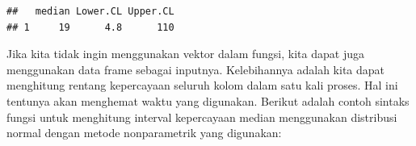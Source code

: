 \documentclass[]{book}
\newenvironment{Shaded}{\begin{snugshade}}{\end{snugshade}}
\newcommand{\KeywordTok}[1]{\textcolor[rgb]{0.13,0.29,0.53}{\textbf{#1}}}
\newcommand{\DataTypeTok}[1]{\textcolor[rgb]{0.13,0.29,0.53}{#1}}
\newcommand{\FloatTok}[1]{\textcolor[rgb]{0.00,0.00,0.81}{#1}}
\newcommand{\OperatorTok}[1]{\textcolor[rgb]{0.81,0.36,0.00}{\textbf{#1}}}
\newcommand{\NormalTok}[1]{#1}
\begin{document}
\begin{Shaded}
\end{Shaded}

\begin{verbatim}
##   median Lower.CL Upper.CL
## 1     19      4.8      110
\end{verbatim}

Jika kita tidak ingin menggunakan vektor dalam fungsi, kita dapat juga
menggunakan data frame sebagai inputnya. Kelebihannya adalah kita dapat
menghitung rentang kepercayaan seluruh kolom dalam satu kali proses. Hal
ini tentunya akan menghemat waktu yang digunakan. Berikut adalah contoh
sintaks fungsi untuk menghitung interval kepercayaan median menggunakan
distribusi normal dengan metode nonparametrik yang digunakan:
\end{document}
